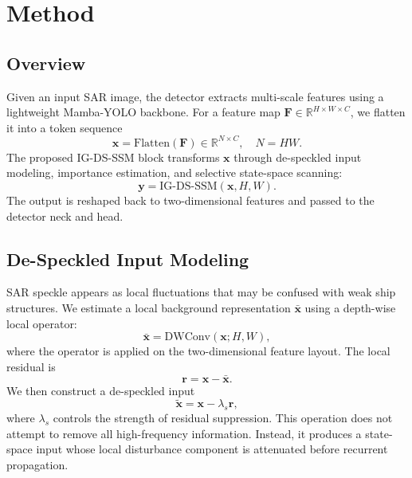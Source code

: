 \documentclass[10pt,twocolumn]{article}
\begin{document}
\section{Method}

\subsection{Overview}

Given an input SAR image, the detector extracts multi-scale features using a lightweight Mamba-YOLO backbone. For a feature map $\mathbf{F}\in\mathbb{R}^{H\times W\times C}$, we flatten it into a token sequence
\begin{equation}
  \mathbf{x}=\mathrm{Flatten}(\mathbf{F})\in\mathbb{R}^{N\times C}, \quad N=HW.
\end{equation}
The proposed IG-DS-SSM block transforms $\mathbf{x}$ through de-speckled input modeling, importance estimation, and selective state-space scanning:
\begin{equation}
  \mathbf{y}=\mathrm{IG\mbox{-}DS\mbox{-}SSM}(\mathbf{x}, H, W).
\end{equation}
The output is reshaped back to two-dimensional features and passed to the detector neck and head.

\subsection{De-Speckled Input Modeling}

SAR speckle appears as local fluctuations that may be confused with weak ship structures. We estimate a local background representation $\bar{\mathbf{x}}$ using a depth-wise local operator:
\begin{equation}
  \bar{\mathbf{x}} = \mathrm{DWConv}(\mathbf{x}; H,W),
\end{equation}
where the operator is applied on the two-dimensional feature layout. The local residual is
\begin{equation}
  \mathbf{r} = \mathbf{x}-\bar{\mathbf{x}}.
\end{equation}
We then construct a de-speckled input
\begin{equation}
  \widetilde{\mathbf{x}} = \mathbf{x} - \lambda_s \mathbf{r},
  \label{eq:debiased-twocol}
\end{equation}
where $\lambda_s$ controls the strength of residual suppression. This operation does not attempt to remove all high-frequency information. Instead, it produces a state-space input whose local disturbance component is attenuated before recurrent propagation.
\end{document}
